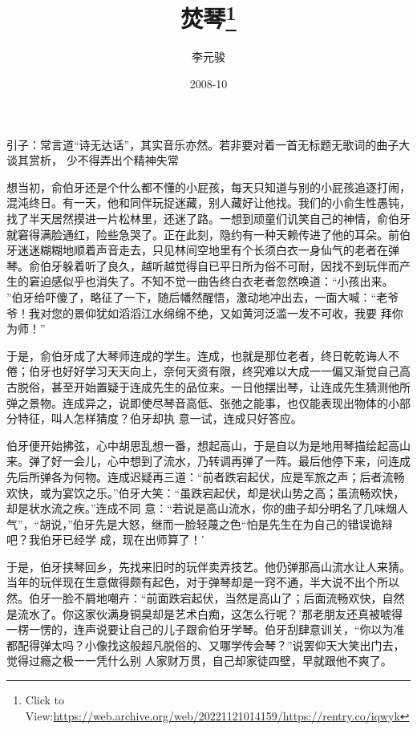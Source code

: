 \documentclass{article}
\title{焚琴\footnote{Click to View:\url{https://web.archive.org/web/20221121014159/https://rentry.co/iqwyk}}}
\author{李元骏}
\date{2008-10}
\begin{document}

\maketitle


\Large

﻿引子：常言道“诗无达话”，其实音乐亦然。若非要对着一首无标题无歌词的曲子大谈其赏析，
少不得弄出个精神失常 

想当初，俞伯牙还是个什么都不懂的小屁孩，每天只知道与别的小屁孩追逐打闹，混沌终日。有一天，他和同伴玩捉迷藏，别人藏好让他找。我们的小俞生性愚钝，找了半天居然摸进一片松林里，还迷了路。一想到顽童们讥笑自己的神情，俞伯牙就窘得满脸通红，险些急哭了。正在此刻，隐约有一种天赖传进了他的耳朵。前伯牙迷迷糊糊地顺着声音走去，只见林间空地里有个长须白衣一身仙气的老者在弹琴。俞伯牙躲着听了良久，越听越觉得自已平日所为俗不可耐，因找不到玩伴而产生的窘迫感似乎也消失了。不知不觉一曲告终白衣老者忽然唤道：“小孩出来。
\newpage
”伯牙给吓傻了，略征了一下，随后幡然醒悟，激动地冲出去，一面大喊：“老爷爷！我对您的景仰犹如滔滔江水绵绵不绝，又如黄河泛滥一发不可收，我要
拜你为师！” 

于是，俞伯牙成了大琴师连成的学生。连成，也就是那位老者，终日乾乾诲人不倦；伯牙也好好学习天天向上，奈何天资有限，终究难以大成一一偏又渐觉自己高古脱俗，甚至开始置疑于连成先生的品位来。一日他摆出琴，让连成先生猜测他所弹之景物。连成异之，说即使尽琴音高低、张弛之能事，也仅能表现出物体的小部分特征，叫人怎样猜度？伯牙却执
意一试，连成只好答应。 

伯牙便开始拂弦，心中胡思乱想一番，想起高山，于是自以为是地用琴描绘起高山来。弹了好一会儿，心中想到了流水，乃转调再弹了一阵。最后他停下来，问连成先后所弹各为何物。连成迟疑再三道：“前者跌宕起伏，应是军旅之声；后者流畅欢快，或为宴饮之乐。”伯牙大笑：“虽跌宕起伏，却是状山势之高；虽流畅欢快，却是状水流之疾。”连成不同
\newpage
意：“若说是高山流水，你的曲子却分明名了几味烟人气”，“胡说，”伯牙先是大怒，继而一脸轻蔑之色“怕是先生在为自己的错误诡辩吧？我伯牙已经学
成，现在出师算了！’ 

于是，伯牙挟琴回乡，先找来旧时的玩伴卖弄技艺。他仍弹那高山流水让人来猜。当年的玩伴现在生意做得颇有起色，对于弹琴却是一窍不通，半大说不出个所以然。伯牙一脸不屑地嘲卉：“前面跌宕起伏，当然是高山了；后面流畅欢快，自然是流水了。你这家伙满身铜臭却是艺术白痴，这怎么行呢？'那老朋友还真被唬得一楞一愣的，连声说要让自己的儿子跟俞伯牙学琴。伯牙刮肆意训关，“你以为准都配得弹太吗？小像找这般超凡脱俗的、又哪学传会琴？”说罢仰天大笑出门去，觉得过瘾之极一一凭什么别
人家财万贯，自己却家徒四壁，早就跟他不爽了。 
\end{document}
